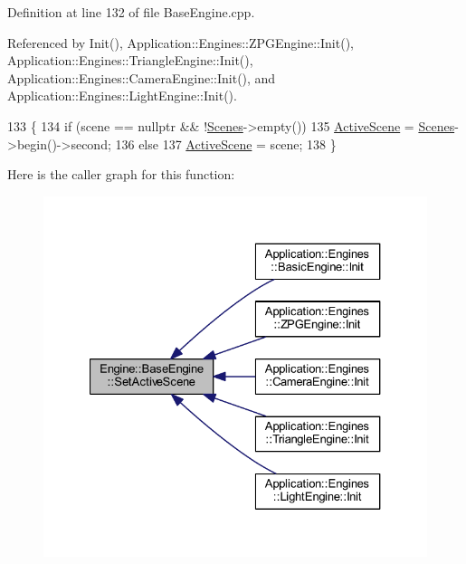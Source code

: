Definition at line 132 of file Base\+Engine.\+cpp.



Referenced by Init(), Application\+::\+Engines\+::\+Z\+P\+G\+Engine\+::\+Init(), Application\+::\+Engines\+::\+Triangle\+Engine\+::\+Init(), Application\+::\+Engines\+::\+Camera\+Engine\+::\+Init(), and Application\+::\+Engines\+::\+Light\+Engine\+::\+Init().


\begin{DoxyCode}
133 \{
134     \textcolor{keywordflow}{if} (scene == \textcolor{keyword}{nullptr} && !\mbox{\hyperlink{classEngine_1_1BaseEngine_afd02af3c2fbe9bb734db014dec06585a}{Scenes}}->empty())
135         \mbox{\hyperlink{classEngine_1_1BaseEngine_adb3dbc839da9d821e08b18d8a221698d}{ActiveScene}} = \mbox{\hyperlink{classEngine_1_1BaseEngine_afd02af3c2fbe9bb734db014dec06585a}{Scenes}}->begin()->second;
136     \textcolor{keywordflow}{else}
137         \mbox{\hyperlink{classEngine_1_1BaseEngine_adb3dbc839da9d821e08b18d8a221698d}{ActiveScene}} = scene;     
138 \}
\end{DoxyCode}
Here is the caller graph for this function\+:
\nopagebreak
\begin{figure}[H]
\begin{center}
\leavevmode
\includegraphics[width=327pt]{classEngine_1_1BaseEngine_afc82c6a00d5a9d4714740fc5eab5db86_icgraph}
\end{center}
\end{figure}
\mbox{\label{classEngine_1_1BaseEngine_a525fdc7a1da7eecb514ad5763f06be79}} 
